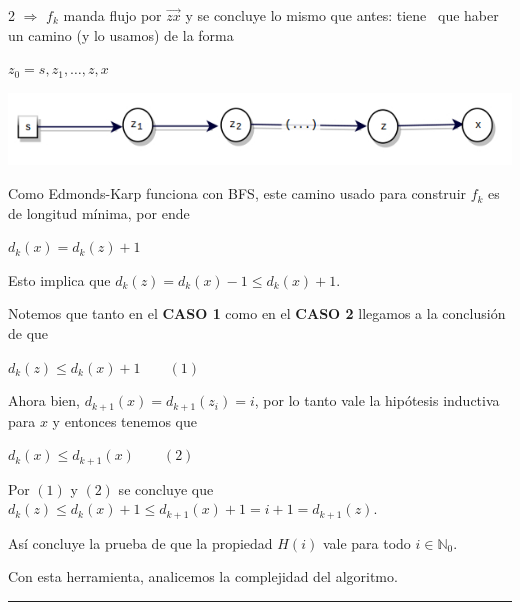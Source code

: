 \documentclass[10pt,a4paper]{article}
\begin{document}
2 $\Rightarrow$ $f_k$ manda flujo por $\overrightarrow{zx}$ y se concluye lo mismo que antes: tiene  que haber un camino (y lo usamos) de la forma

\begin{center}
$z_0=s, z_1, \dots, z,x$
\end{center}

\begin{center}

    \begin{adjustbox}{max size={\textwidth}{\textheight}}
        \includegraphics{definitions/prueba_EK5.jpg}
        \end{adjustbox}
    
\end{center}

Como Edmonds-Karp funciona con BFS, este camino usado para construir $f_k$ es de longitud mínima, por ende

\begin{center}
$d_k(x) = d_k(z)+1$
\end{center}

Esto implica que $d_k(z) = d_k(x)-1\leq d_k(x) + 1$.

Notemos que tanto en el \textbf{CASO 1} como en el \textbf{CASO 2} llegamos a la conclusión de que

\begin{center}
$d_k(z) \leq d_k(x)+1 \quad \quad(1)$
\end{center}

Ahora bien, $d_{k+1}(x) = d_{k+1}(z_i) = i$, por lo tanto vale la hipótesis inductiva para $x$ y entonces tenemos que

\begin{center}
$d_k(x) \leq d_{k+1}(x)\quad\quad (2)$
\end{center}

Por $(1)$ y $(2)$ se concluye que $d_k(z) \leq d_k(x) + 1\leq d_{k+1}(x) +1 = i + 1 = d_{k+1}(z)$.

Así concluye la prueba de que la propiedad $H(i)$ vale para todo $i\in \mathbb{N}_0$.

Con esta herramienta, analicemos la complejidad del algoritmo.

\vspace{0.5cm}\hrule\vspace{0.5cm}
 
\end{document}
